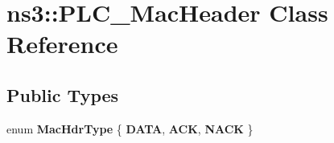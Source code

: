 \hypertarget{classns3_1_1PLC__MacHeader}{\section{ns3\-:\-:\-P\-L\-C\-\_\-\-Mac\-Header \-Class \-Reference}
\label{classns3_1_1PLC__MacHeader}
}
\subsection*{\-Public \-Types}
\begin{DoxyCompactItemize}
\item 
enum {\bfseries \-Mac\-Hdr\-Type} \{ {\bfseries \-D\-A\-T\-A}, 
{\bfseries \-A\-C\-K}, 
{\bfseries \-N\-A\-C\-K}
 \}
\end{DoxyCompactItemize}
